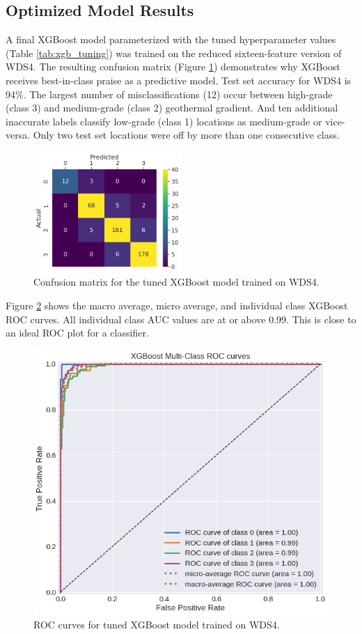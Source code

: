\subsection{Optimized Model Results}\label{ch5:xgb_final_results}
A final XGBoost model parameterized with the tuned hyperparameter values (Table \ref{tab:xgb_tuning}) was trained on the reduced sixteen-feature version of WDS4. The resulting confusion matrix (Figure \ref{fig:xgb_conf_matrix}) demonstrates why XGBoost receives best-in-class praise as a predictive model. Test set accuracy for WDS4 is 94\%. The largest number of misclassifications (12) occur between high-grade (class 3) and medium-grade (class 2) geothermal gradient. And ten additional inaccurate labels classify low-grade (class 1) locations as medium-grade or vice-versa. Only two test set locations were off by more than one consecutive class.

\begin{figure}[!htp]
\centering
\includegraphics[width=0.5\textwidth]{templates/images/Figure-XGB16-ConfusionMatrix.png}
\singlespacing
\caption[XGBoost confusion matrix]{Confusion matrix for the tuned XGBoost model trained on WDS4.}
\label{fig:xgb_conf_matrix}
\end{figure}
Figure \ref{fig:xgb_auc} shows the macro average, micro average, and individual class XGBoost ROC curves. All individual class AUC values are at or above 0.99. This is close to an ideal ROC plot for a classifier.

\begin{figure}[htp]
\centering
\includegraphics[width=.6\textwidth]{templates/images/Figure-XGB16-AUC.png}
\caption[XGBoost ROC curves]{ROC curves for tuned XGBoost model trained on WDS4.}
\label{fig:xgb_auc}
\end{figure}

